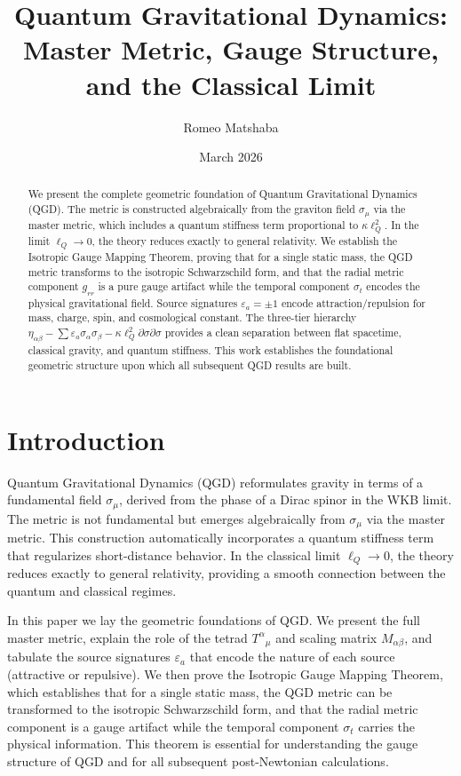 \documentclass[12pt,prd,preprintnumbers,amsmath,amssymb]{revtex4-2}
\theoremstyle{definition}
\theoremstyle{remark}
\begin{document}
\title{Quantum Gravitational Dynamics: Master Metric, Gauge Structure, and the Classical Limit}
\author{Romeo Matshaba}
\date{March 2026}

\begin{abstract}
We present the complete geometric foundation of Quantum Gravitational Dynamics (QGD). The metric is constructed algebraically from the graviton field $\sigma_\mu$ via the master metric, which includes a quantum stiffness term proportional to $\kappa\ell_Q^2$. In the limit $\ell_Q \to 0$, the theory reduces exactly to general relativity. We establish the Isotropic Gauge Mapping Theorem, proving that for a single static mass, the QGD metric transforms to the isotropic Schwarzschild form, and that the radial metric component $g_{rr}$ is a pure gauge artifact while the temporal component $\sigma_t$ encodes the physical gravitational field. Source signatures $\varepsilon_a = \pm 1$ encode attraction/repulsion for mass, charge, spin, and cosmological constant. The three-tier hierarchy $\eta_{\alpha\beta} - \sum\varepsilon_a\sigma_\alpha\sigma_\beta - \kappa\ell_Q^2\partial\sigma\partial\sigma$ provides a clean separation between flat spacetime, classical gravity, and quantum stiffness. This work establishes the foundational geometric structure upon which all subsequent QGD results are built.
\end{abstract}

\maketitle

\section{Introduction}

Quantum Gravitational Dynamics (QGD) reformulates gravity in terms of a fundamental field $\sigma_\mu$, derived from the phase of a Dirac spinor in the WKB limit. The metric is not fundamental but emerges algebraically from $\sigma_\mu$ via the master metric. This construction automatically incorporates a quantum stiffness term that regularizes short-distance behavior. In the classical limit $\ell_Q \to 0$, the theory reduces exactly to general relativity, providing a smooth connection between the quantum and classical regimes.

In this paper we lay the geometric foundations of QGD. We present the full master metric, explain the role of the tetrad $T^\alpha{}_\mu$ and scaling matrix $M_{\alpha\beta}$, and tabulate the source signatures $\varepsilon_a$ that encode the nature of each source (attractive or repulsive). We then prove the Isotropic Gauge Mapping Theorem, which establishes that for a single static mass, the QGD metric can be transformed to the isotropic Schwarzschild form, and that the radial metric component is a gauge artifact while the temporal component $\sigma_t$ carries the physical information. This theorem is essential for understanding the gauge structure of QGD and for all subsequent post-Newtonian calculations.
\end{document}
